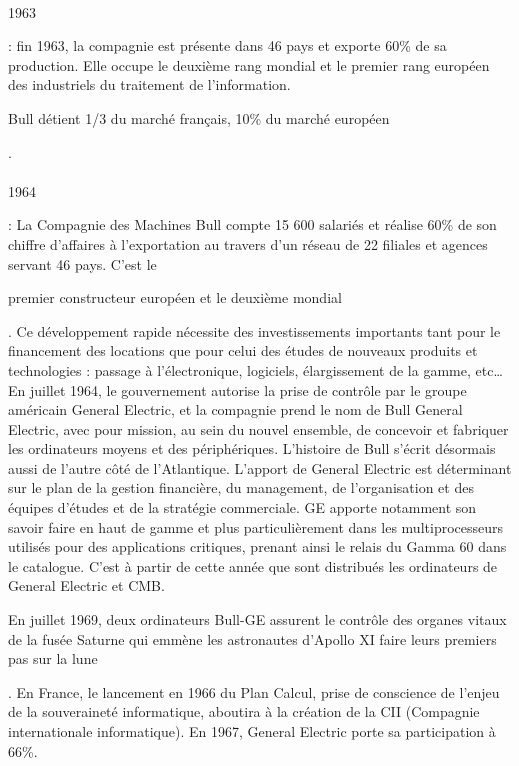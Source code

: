 \documentclass{article}
\begin{document}
		\paragraph{}
		\begin{bf}1963\end{bf}: fin 1963, la compagnie est présente dans 46 pays et exporte 60\% de sa production. Elle 
		occupe le deuxième rang mondial et le premier rang européen des industriels du traitement de l’information. \begin{bf}Bull 
		détient 1/3 du marché français, 10\% du marché européen\end{bf}.
		\paragraph{}
		\begin{bf}1964\end{bf}: La Compagnie des Machines Bull compte 15 600 salariés et réalise 60\% de son chiffre 
		d’affaires à l’exportation au travers d’un réseau de 22 filiales et agences servant 46 pays. C’est le \begin{bf}premier 
		constructeur européen et le deuxième mondial\end{bf}. Ce développement rapide nécessite des investissements importants 
		tant pour le financement des locations que pour celui des études de nouveaux produits et technologies : passage à 
		l’électronique, logiciels, élargissement de la gamme, etc…\newline{}
		En juillet 1964, le gouvernement autorise la prise de contrôle par le groupe américain General Electric, et la 
		compagnie prend le nom de Bull General Electric, avec pour mission, au sein du nouvel ensemble, de concevoir et 
		fabriquer les ordinateurs moyens et des périphériques.\newline{}
		L’histoire de Bull s’écrit désormais aussi de l’autre côté de l’Atlantique. L’apport de General Electric est 
		déterminant sur le plan de la gestion financière, du management, de l’organisation et des équipes d’études et de la 
		stratégie commerciale. GE apporte notamment son savoir faire en haut de gamme et plus particulièrement dans les 
		multiprocesseurs utilisés pour des applications critiques, prenant ainsi le relais du Gamma 60 dans le catalogue. 
		C’est à partir de cette année que sont distribués les ordinateurs de General Electric et CMB. \begin{bf}En juillet 1969, deux 
		ordinateurs Bull-GE assurent le contrôle des organes vitaux de la fusée Saturne qui emmène les astronautes d’Apollo XI 
		faire leurs premiers pas sur la lune\end{bf}. En France, le lancement en 1966 du Plan Calcul, prise de conscience de l’enjeu 
		de la souveraineté informatique, aboutira à la création de la CII (Compagnie internationale informatique). En 1967, 
		General Electric porte sa participation à 66\%.
\end{document}
